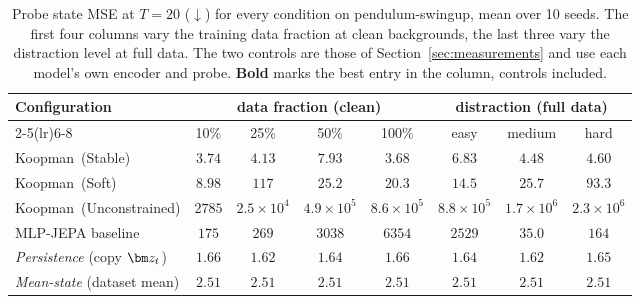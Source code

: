 \begin{table}[t]
\caption{Probe state MSE at $T{=}20$ ($\downarrow$) for every condition on pendulum-swingup, mean over 10 seeds. The first four columns vary the training data fraction at clean backgrounds, the last three vary the distraction level at full data. The two controls are those of Section~\ref{sec:measurements} and use each model's own encoder and probe. \textbf{Bold} marks the best entry in the column, controls included.}
\label{tab:full_controls_pendulum}
\centering
\small
\begin{tabular}{@{}lccccccc@{}}
\toprule
\textbf{Configuration} & \multicolumn{4}{c}{\textbf{data fraction (clean)}} & \multicolumn{3}{c}{\textbf{distraction (full data)}} \\
\cmidrule(lr){2-5}\cmidrule(lr){6-8}
 & 10\% & 25\% & 50\% & 100\% & easy & medium & hard \\
\midrule
Koopman~(Stable)                   & $3.74$ & $4.13$ & $7.93$ & $3.68$ & $6.83$ & $4.48$ & $4.60$ \\
Koopman~(Soft)                     & $8.98$ & $117$ & $25.2$ & $20.3$ & $14.5$ & $25.7$ & $93.3$ \\
Koopman~(Unconstrained)            & $2785$ & $2.5{\times}10^{4}$ & $4.9{\times}10^{5}$ & $8.6{\times}10^{5}$ & $8.8{\times}10^{5}$ & $1.7{\times}10^{6}$ & $2.3{\times}10^{6}$ \\
MLP-JEPA baseline                  & $175$ & $269$ & $3038$ & $6354$ & $2529$ & $35.0$ & $164$ \\
\midrule
\emph{Persistence} (copy $\z_t$)   & $\mathbf{1.66}$ & $\mathbf{1.62}$ & $\mathbf{1.64}$ & $\mathbf{1.66}$ & $\mathbf{1.64}$ & $\mathbf{1.62}$ & $\mathbf{1.65}$ \\
\emph{Mean-state} (dataset mean)   & $2.51$ & $2.51$ & $2.51$ & $2.51$ & $2.51$ & $2.51$ & $2.51$ \\
\bottomrule
\end{tabular}
\end{table}
